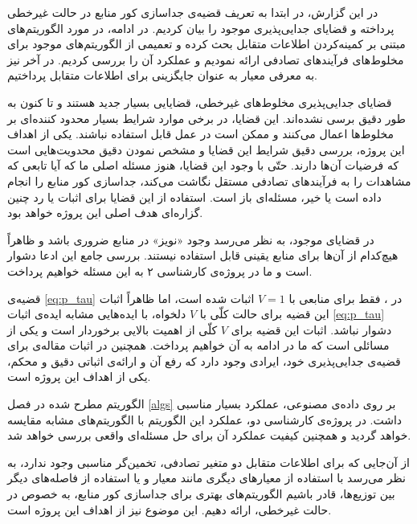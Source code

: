 \label{conclusion}
در این گزارش،  در ابتدا به تعریف قضیه‌ی جداسازی کور منابع در حالت غیرخطی پرداخته و قضایای جدایی‌پذیری موجود را بیان کردیم. در ادامه، در مورد الگوریتم‌های مبتنی بر کمینه‌کردن اطلاعات متقابل بحث کرده و تعمیمی از الگوریتم‌های موجود برای مخلوط‌های فرآیند‌های تصادفی ارائه نمودیم و عملکرد آن را بررسی کردیم. در آخر نیز به معرفی معیار 
به عنوان جایگزینی برای اطلاعات متقابل پرداختیم. 

قضایای جدایی‌پذیری مخلوط‌های غیرخطی، قضایایی بسیار جدید هستند و تا کنون به طور دقیق برسی نشده‌اند. این قضایا، در برخی موارد شرایط بسیار محدود کننده‌ای بر مخلوط‌ها اعمال می‌کنند و ممکن است در عمل قابل استفاده نباشند. یکی از اهداف این پروژه، بررسی دقیق شرایط این قضایا و مشخص نمودن دقیق محدویت‌هایی است که فرضیات آن‌ها دارند. حتّی با وجود این قضایا، هنوز  مسئله  اصلی ما که آیا تابعی که مشاهدات را به فرآیند‌های تصادفی مستقل نگاشت می‌کند، جداسازی کور منابع را انجام داده است یا خیر، مسئله‌ای باز است. استفاده از این قضایا برای اثبات یا رد چنین گزاره‌ای هدف اصلی این پروژه خواهد بود.

در قضایای موجود، به نظر می‌رسد وجود «نویز» در منابع ضروری باشد و ظاهراً هیچ‌کدام از آن‌ها برای منابع یقینی قابل استفاده نیستند. بررسی جامع این ادعا دشوار است و ما در پروژه‌ی کارشناسی ۲ به این مسئله خواهیم پرداخت.

قضیه‌ی 
\eqref{eq:p_tau}
در 
\cite{TCL}،
فقط برای منابعی با 
$V=1$
اثبات شده است، اما ظاهراً اثبات این قضیه برای حالت کلّی با 
$V$
دلخواه، با ایده‌هایی مشابه ایده‌ی اثبات
\eqref{eq:p_tau}
دشوار نباشد. اثبات این قضیه برای
$V$
کلّی از اهمیت بالایی برخوردار است و یکی از مسائلی است که ما در ادامه به آن خواهیم پرداخت. همچنین در اثبات مقاله‌ی 
\cite{PCL}
برای قضیه‌ی جدایی‌پذیری خود، ایرادی وجود دارد که رفع آن و ارائه‌ی اثباتی دقیق و محکم، یکی از اهداف این پروژه است. 

الگوریتم مطرح شده در فصل 
\eqref{algs}
بر روی داده‌ی مصنوعی، عملکرد بسیار مناسبی داشت. در پروژه‌ی کارشناسی دو، عملکرد این الگوریتم با الگوریتم‌های مشابه مقایسه خواهد گردید و همچنین کیفیت عملکرد آن برای حل مسئله‌ای واقعی بررسی خواهد شد. 

از آن‌جایی که برای اطلاعات متقابل دو متغیر تصادفی، تخمین‌گر مناسبی وجود ندارد، به نظر می‌رسد  با استفاده از معیار‌های دیگری مانند معیار 
و یا استفاده از فاصله‌های دیگر بین توزیع‌ها، قادر باشیم الگوریتم‌های بهتری برای جداسازی کور منابع، به خصوص در حالت غیرخطی، ارائه دهیم. این موضوع نیز از اهداف این پروژه است.





